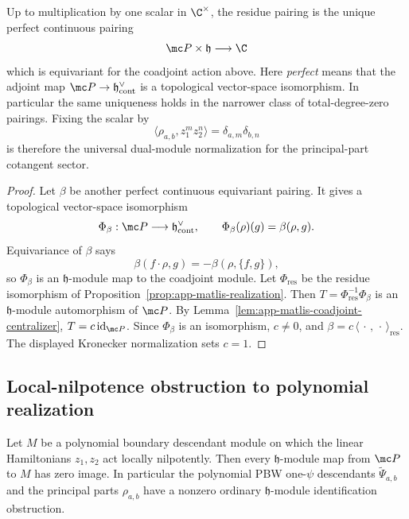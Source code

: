 \begin{thm}
\label{thm:app-matlis-residue-rigidity}
  Up to multiplication by one scalar in \(\C^\times\), the residue
  pairing is the unique perfect continuous pairing
  \[
    \mc P\times\mathfrak h\longrightarrow\C
  \]
  which is equivariant for the coadjoint action above.  Here
  \emph{perfect} means that the adjoint map
  \(\mc P\to\mathfrak h^\vee_{\mathrm{cont}}\) is a topological
  vector-space isomorphism.  In particular the same uniqueness holds in
  the narrower class of total-degree-zero pairings.  Fixing the scalar by
  \[
    \langle\rho_{a,b},z_1^m z_2^n\rangle
      =\delta_{a,m}\delta_{b,n}
  \]
  is therefore the universal dual-module normalization for the
  principal-part cotangent sector.
\end{thm}

\begin{proof}
  Let \(\beta\) be another perfect continuous equivariant pairing.  It
  gives a topological vector-space isomorphism
  \[
    \Phi_\beta:\mc P\longrightarrow\mathfrak h^\vee_{\mathrm{cont}},
    \qquad
    \Phi_\beta(\rho)(g)=\beta(\rho,g).
  \]
  Equivariance of \(\beta\) says
  \[
    \beta(f\cdot\rho,g)=-\beta(\rho,\{f,g\}),
  \]
  so \(\Phi_\beta\) is an \(\mathfrak h\)-module map to the coadjoint
  module.  Let \(\Phi_{\mathrm{res}}\) be the residue isomorphism of
  Proposition~\ref{prop:app-matlis-realization}.  Then
  \(T=\Phi_{\mathrm{res}}^{-1}\Phi_\beta\) is an \(\mathfrak h\)-module
  automorphism of \(\mc P\).  By
  Lemma~\ref{lem:app-matlis-coadjoint-centralizer},
  \(T=c\,\mathrm{id}_{\mc P}\).  Since \(\Phi_\beta\) is an isomorphism,
  \(c\neq0\), and
  \(\beta=c\,\langle\,\cdot\,,\,\cdot\,\rangle_{\mathrm{res}}\).  The
  displayed Kronecker normalization sets \(c=1\).
\end{proof}

\subsection{Local-nilpotence obstruction to polynomial realization}
\label{ssec:app-matlis-polynomial-obstruction}

\begin{thm}
\label{thm:app-matlis-polynomial-descendant-obstruction}
  Let \(M\) be a polynomial boundary descendant module on which the
  linear Hamiltonians \(z_1,z_2\) act locally nilpotently.  Then
  every \(\mathfrak h\)-module map from \(\mc P\) to \(M\) has zero image.
  In particular the polynomial PBW one-\(\psi\) descendants
  \(\widetilde\Psi_{a,b}\) and the principal parts \(\rho_{a,b}\) have a
  nonzero ordinary \(\mathfrak h\)-module identification obstruction.
\end{thm}

